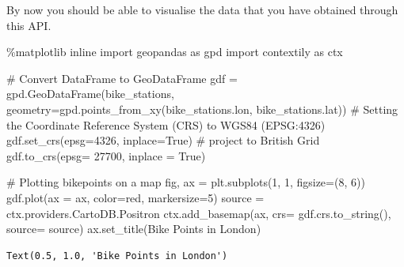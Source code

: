 \documentclass[
  letterpaper,
  DIV=11,
  numbers=noendperiod]{scrreprt}
\newenvironment{Shaded}{\begin{snugshade}}{\end{snugshade}}
\newcommand{\CommentTok}[1]{\textcolor[rgb]{0.37,0.37,0.37}{#1}}
\newcommand{\DecValTok}[1]{\textcolor[rgb]{0.68,0.00,0.00}{#1}}
\newcommand{\ImportTok}[1]{\textcolor[rgb]{0.00,0.46,0.62}{#1}}
\newcommand{\NormalTok}[1]{\textcolor[rgb]{0.00,0.23,0.31}{#1}}
\newcommand{\OperatorTok}[1]{\textcolor[rgb]{0.37,0.37,0.37}{#1}}
\newcommand{\StringTok}[1]{\textcolor[rgb]{0.13,0.47,0.30}{#1}}
\newcommand{\VariableTok}[1]{\textcolor[rgb]{0.07,0.07,0.07}{#1}}
\begin{document}
By now you should be able to visualise the data that you have obtained
through this API.

\begin{Shaded}
\begin{Highlighting}[]
\OperatorTok{\%}\NormalTok{matplotlib inline}
\ImportTok{import}\NormalTok{ geopandas }\ImportTok{as}\NormalTok{ gpd}
\ImportTok{import}\NormalTok{ contextily }\ImportTok{as}\NormalTok{ ctx}

\CommentTok{\# Convert DataFrame to GeoDataFrame}
\NormalTok{gdf }\OperatorTok{=}\NormalTok{ gpd.GeoDataFrame(bike\_stations, geometry}\OperatorTok{=}\NormalTok{gpd.points\_from\_xy(bike\_stations.lon, bike\_stations.lat))}
\CommentTok{\# Setting the Coordinate Reference System (CRS) to WGS84 (EPSG:4326)}
\NormalTok{gdf.set\_crs(epsg}\OperatorTok{=}\DecValTok{4326}\NormalTok{, inplace}\OperatorTok{=}\VariableTok{True}\NormalTok{)}
\CommentTok{\# project to British Grid}
\NormalTok{gdf.to\_crs(epsg}\OperatorTok{=} \DecValTok{27700}\NormalTok{, inplace }\OperatorTok{=} \VariableTok{True}\NormalTok{)}

\CommentTok{\# Plotting bikepoints on a map}
\NormalTok{fig, ax }\OperatorTok{=}\NormalTok{ plt.subplots(}\DecValTok{1}\NormalTok{, }\DecValTok{1}\NormalTok{, figsize}\OperatorTok{=}\NormalTok{(}\DecValTok{8}\NormalTok{, }\DecValTok{6}\NormalTok{))}
\NormalTok{gdf.plot(ax }\OperatorTok{=}\NormalTok{ ax, color}\OperatorTok{=}\StringTok{\textquotesingle{}red\textquotesingle{}}\NormalTok{, markersize}\OperatorTok{=}\DecValTok{5}\NormalTok{)}
\NormalTok{source }\OperatorTok{=}\NormalTok{ ctx.providers.CartoDB.Positron}
\NormalTok{ctx.add\_basemap(ax, crs}\OperatorTok{=}\NormalTok{ gdf.crs.to\_string(), source}\OperatorTok{=}\NormalTok{ source)}
\NormalTok{ax.set\_title(}\StringTok{\textquotesingle{}Bike Points in London\textquotesingle{}}\NormalTok{)}
\end{Highlighting}
\end{Shaded}

\begin{verbatim}
Text(0.5, 1.0, 'Bike Points in London')
\end{verbatim}
\end{document}
